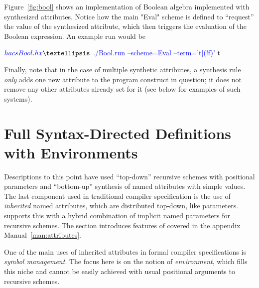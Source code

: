 \documentclass[11pt]{article} %
\begin{document}
\begin{example}\label{ex:bool}
  Figure~\ref{fig:bool} shows an implementation of Boolean algebra implemented with synthesized
  attributes. Notice how the main "Eval" scheme is defined to ``request'' the value of the
  synthesized attribute, which then triggers the evaluation of the Boolean expression. An example
  run would be
  \begin{code}[commandchars=\\\{\}]
$ \textcolor{blue}{hacs Bool.hx}
…
$ \textcolor{blue}{./Bool.run --scheme=Eval --term='t|(!f)'}
 t
  \end{code}
\end{example}

Finally, note that in the case of multiple synthetic attributes, a synthesis rule \emph{only} adds
one new attribute to the program construct in question; it does not remove any other attributes
already set for it (see below for examples of such systems). %


\section{Full Syntax-Directed Definitions with Environments}
\label{sec:sdd}

Descriptions to this point have used ``top-down'' recursive schemes with positional parameters and
``bottom-up'' synthesis of named attributes with simple values. The last component used in
traditional compiler specification is the use of \emph{inherited} named attributes, which are
distributed top-down, like parameters. \HAX supports this with a hybrid combination of implicit
named parameters for recursive schemes. The section introduces features of \HAX covered in the
appendix Manual~\ref{man:attributes}.

One of the main uses of inherited attributes in formal compiler specifications is \emph{symbol
  management}. The focus here is on the \HAX notion of \emph{environment}, which fills this niche
and cannot be easily achieved with usual positional arguments to recursive schemes.
\end{document}
